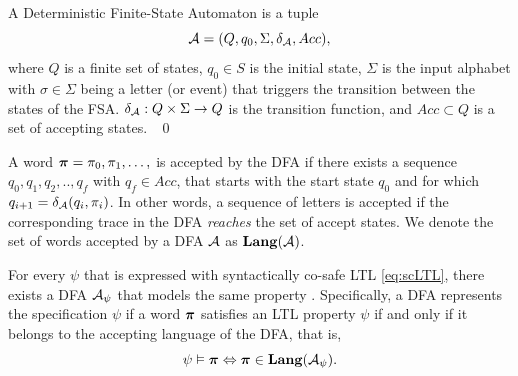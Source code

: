 \documentclass{ifacconf}
\newcommand{\new}[1]{{\color{blue}#1}}
\begin{document}
\begin{definition}
A Deterministic Finite-State Automaton is a tuple
 \[\mathcal{A} = (Q, q_0, \Sigma, \delta_{\mathcal{A}}, Acc),\] where %
$Q$ is a finite set of states, $q_0 \in S$ is the initial state,
$\Sigma$ is the input alphabet with $\sigma\in\Sigma$ being a letter (or event) that triggers the transition between the states of the FSA.   
$\delta_{\mathcal{A}} : Q \times \Sigma \rightarrow Q$ is the transition function, and
$Acc\subset Q$ is a set of accepting states. \hfill \mbox{ }\qed
\end{definition}
\new{A word ${\boldsymbol{\pi}} = \pi_0, \pi_1,\ldots,$ is accepted by the DFA if there exists a sequence $q_0,q_1, q_2, .., q_f$ with $q_f\in Acc$, that starts with the start state $q_0$  and for which $q_{i+1}=\delta_{\mathcal{A}}(q_i,\pi_i)$.
In other words, a sequence of letters is accepted if the corresponding trace in the DFA {\it reaches} the set of accept states. We denote the set of words accepted by a DFA $\mathcal{A}$ as $\mathbf{Lang} (\mathcal A)$.}





For every $\psi$ that is expressed with syntactically co-safe LTL  \eqref{eq:scLTL}, there exists a DFA  $\mathcal{A}_\psi$ that models the same property \citep{Belta2017}. Specifically, a DFA represents the specification $\psi$ if a word ${\boldsymbol{\pi}}$ satisfies an LTL property $\psi$ if and only if it belongs to the accepting language of the DFA, that is,
	 \[\psi\vDash{\boldsymbol{\pi}} \Leftrightarrow {\boldsymbol{\pi}}\in \mathbf{Lang}(\mathcal A_\psi).\]
\end{document}
